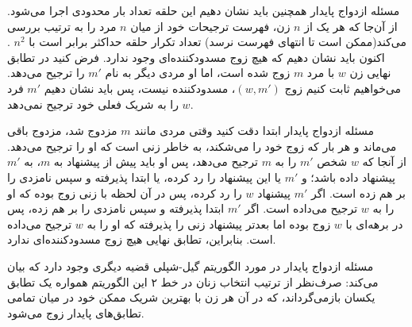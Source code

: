 \begin{itemframe}{مسئله ازدواج پایدار}
\itm
همچنین باید نشان دهیم این حلقه‌ تعداد بار محدودی اجرا می‌شود.
 از آن‌جا که هر یک از $n$ زن، فهرست ترجیحات خود از میان $n$ مرد را به ترتیب بررسی می‌کند‌(ممکن است تا انتهای فهرست نرسد) تعداد تکرار حلقه حداکثر برابر است با
$n^2$
.
\itm
اکنون باید نشان دهیم که هیچ زوج مسدودکننده‌ای وجود ندارد.
\itm
فرض کنید در تطابق نهایی زن $w$ با مرد $m$ زوج شده است، اما او مردی دیگر به نام $m'$ را ترجیح می‌دهد.
می‌خواهیم ثابت کنیم زوج $(w, m')$، مسدودکننده نیست، پس باید نشان دهیم $m'$ فرد $w$ را به شریک فعلی خود ترجیح نمی‌دهد.
\end{itemframe}

\begin{itemframe}{مسئله ازدواج پایدار}
\itm
ابتدا دقت کنید وقتی مردی مانند $m$ مزدوج شد، مزدوج باقی می‌ماند و هر بار که زوج خود را می‌شکند، به خاطر زنی است که او را ترجیح می‌دهد.
\itm
از آنجا که $w$ شخص $m'$ را به $m$ ترجیح می‌دهد، پس او باید پیش از پیشنهاد به $m$، به $m'$ پیشنهاد داده باشد؛ و $m'$ یا این پیشنهاد را رد کرده، یا ابتدا پذیرفته و سپس نامزدی را بر هم زده است.
\itm
اگر $m'$ پیشنهاد $w$ را رد کرده، پس در آن لحظه با زنی زوج بوده که او را به $w$ ترجیح می‌داده است.
 اگر $m'$ ابتدا پذیرفته و سپس نامزدی را بر هم زده، پس در برهه‌ای با $w$ زوج بوده اما بعدتر پیشنهاد زنی را پذیرفته که او را به $w$ ترجیح می‌داده است.
\itm
بنابراین، تطابق نهایی هیچ زوج مسدودکننده‌ای ندارد.
\end{itemframe}

\begin{itemframe}{مسئله ازدواج پایدار}
\itm
در مورد الگوریتم گیل-شپلی قضیه دیگری وجود دارد که بیان می‌کند: صرف‌نظر از ترتیب انتخاب زنان در خط ۲ این الگوریتم همواره یک تطابق یکسان بازمی‌گرداند، که در آن هر زن با بهترین شریک ممکن خود در میان تمامی تطابق‌های پایدار زوج می‌شود.

\end{itemframe}